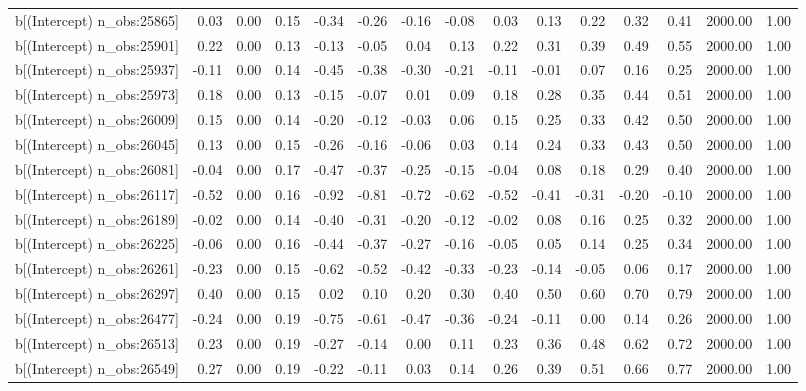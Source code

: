 \begin{table}[ht]
\begin{tabular}{rrrrrrrrrrrrrrr}
  b[(Intercept) n\_obs:25865] & 0.03 & 0.00 & 0.15 & -0.34 & -0.26 & -0.16 & -0.08 & 0.03 & 0.13 & 0.22 & 0.32 & 0.41 & 2000.00 & 1.00 \\ 
  b[(Intercept) n\_obs:25901] & 0.22 & 0.00 & 0.13 & -0.13 & -0.05 & 0.04 & 0.13 & 0.22 & 0.31 & 0.39 & 0.49 & 0.55 & 2000.00 & 1.00 \\ 
  b[(Intercept) n\_obs:25937] & -0.11 & 0.00 & 0.14 & -0.45 & -0.38 & -0.30 & -0.21 & -0.11 & -0.01 & 0.07 & 0.16 & 0.25 & 2000.00 & 1.00 \\ 
  b[(Intercept) n\_obs:25973] & 0.18 & 0.00 & 0.13 & -0.15 & -0.07 & 0.01 & 0.09 & 0.18 & 0.28 & 0.35 & 0.44 & 0.51 & 2000.00 & 1.00 \\ 
  b[(Intercept) n\_obs:26009] & 0.15 & 0.00 & 0.14 & -0.20 & -0.12 & -0.03 & 0.06 & 0.15 & 0.25 & 0.33 & 0.42 & 0.50 & 2000.00 & 1.00 \\ 
  b[(Intercept) n\_obs:26045] & 0.13 & 0.00 & 0.15 & -0.26 & -0.16 & -0.06 & 0.03 & 0.14 & 0.24 & 0.33 & 0.43 & 0.50 & 2000.00 & 1.00 \\ 
  b[(Intercept) n\_obs:26081] & -0.04 & 0.00 & 0.17 & -0.47 & -0.37 & -0.25 & -0.15 & -0.04 & 0.08 & 0.18 & 0.29 & 0.40 & 2000.00 & 1.00 \\ 
  b[(Intercept) n\_obs:26117] & -0.52 & 0.00 & 0.16 & -0.92 & -0.81 & -0.72 & -0.62 & -0.52 & -0.41 & -0.31 & -0.20 & -0.10 & 2000.00 & 1.00 \\ 
  b[(Intercept) n\_obs:26189] & -0.02 & 0.00 & 0.14 & -0.40 & -0.31 & -0.20 & -0.12 & -0.02 & 0.08 & 0.16 & 0.25 & 0.32 & 2000.00 & 1.00 \\ 
  b[(Intercept) n\_obs:26225] & -0.06 & 0.00 & 0.16 & -0.44 & -0.37 & -0.27 & -0.16 & -0.05 & 0.05 & 0.14 & 0.25 & 0.34 & 2000.00 & 1.00 \\ 
  b[(Intercept) n\_obs:26261] & -0.23 & 0.00 & 0.15 & -0.62 & -0.52 & -0.42 & -0.33 & -0.23 & -0.14 & -0.05 & 0.06 & 0.17 & 2000.00 & 1.00 \\ 
  b[(Intercept) n\_obs:26297] & 0.40 & 0.00 & 0.15 & 0.02 & 0.10 & 0.20 & 0.30 & 0.40 & 0.50 & 0.60 & 0.70 & 0.79 & 2000.00 & 1.00 \\ 
  b[(Intercept) n\_obs:26477] & -0.24 & 0.00 & 0.19 & -0.75 & -0.61 & -0.47 & -0.36 & -0.24 & -0.11 & 0.00 & 0.14 & 0.26 & 2000.00 & 1.00 \\ 
  b[(Intercept) n\_obs:26513] & 0.23 & 0.00 & 0.19 & -0.27 & -0.14 & 0.00 & 0.11 & 0.23 & 0.36 & 0.48 & 0.62 & 0.72 & 2000.00 & 1.00 \\ 
  b[(Intercept) n\_obs:26549] & 0.27 & 0.00 & 0.19 & -0.22 & -0.11 & 0.03 & 0.14 & 0.26 & 0.39 & 0.51 & 0.66 & 0.77 & 2000.00 & 1.00 \\ 

\end{tabular}
\end{table}
